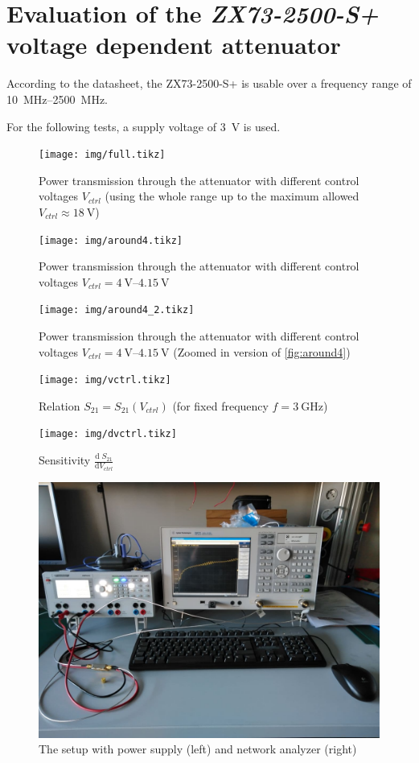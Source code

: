 \section{Evaluation of the \textit{ZX73-2500-S+} voltage dependent attenuator}

According to the datasheet, the ZX73-2500-S+ is usable over a frequency range of \SIrange{10}{2500}{\MHz}.

For the following tests, a supply voltage of \SI{3}{\V} is used.

\begin{figure}[H]
	\centering
	\texttt{[image: img/full.tikz]}
	\caption{Power transmission through the attenuator with different control voltages $V_{ctrl}$ (using the whole range up to the maximum allowed $V_{ctrl} \approx \SI{18}{\volt}$)}
	\label{fig:full}
\end{figure}

\begin{figure}[H]
	\centering
	\texttt{[image: img/around4.tikz]}
	\caption{Power transmission through the attenuator with different control voltages $V_{ctrl} = \SIrange{4}{4.15}{\volt}$}
	\label{fig:around4}
\end{figure}

\begin{figure}[H]
	\centering
	\texttt{[image: img/around4\_2.tikz]}
	\caption{Power transmission through the attenuator with different control voltages $V_{ctrl} = \SIrange{4}{4.15}{\volt}$ (Zoomed in version of \autoref{fig:around4})}
	\label{fig:around4_2}
\end{figure}

\begin{figure}[H]
	\centering
	\texttt{[image: img/vctrl.tikz]}
	\caption{Relation $S_{21} = S_{21}(V_{ctrl})$ (for fixed frequency $f=\SI{3}{\GHz}$)}
	\label{fig:vctrl}
\end{figure}

\begin{figure}[H]
	\centering
	\texttt{[image: img/dvctrl.tikz]}
	\caption{Sensitivity $\frac{\text{d}\;S_{21}}{\text{d}V_{ctrl}}$}
	\label{fig:dvctrl}
\end{figure}

\begin{figure}[H]
	\centering
	\includegraphics[width=\textwidth]{img/setup.jpg}
	\caption{The setup with power supply (left) and network analyzer (right)}
	\label{fig:setup}
\end{figure}


